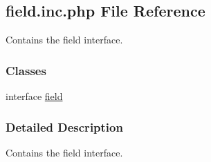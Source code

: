 \hypertarget{field_8inc_8php}{\subsection{field.\-inc.\-php File Reference}
\label{field_8inc_8php}
}


Contains the field interface.  


\subsubsection*{Classes}
\begin{DoxyCompactItemize}
\item 
interface \hyperlink{interfacefield}{field}
\end{DoxyCompactItemize}


\subsubsection{Detailed Description}
Contains the field interface. 